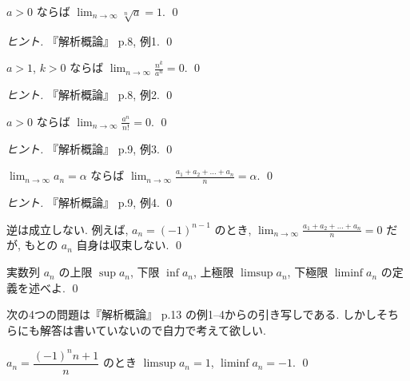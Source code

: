 \documentclass[12pt,twoside]{jarticle}
\begin{document}
\begin{question}
  $a>0$ ならば $\displaystyle\lim_{n\to\infty}\sqrt[n]{a}=1$.
  \qed
\end{question}

\begin{proof}[ヒント]
 『解析概論』\cite{takagi} p.8, 例1. \qed
\end{proof}

\begin{question}
  $a>1$, $k>0$ ならば $\displaystyle\lim_{n\to\infty}\frac{n^k}{a^n}=0$.
  \qed
\end{question}

\begin{proof}[ヒント]
 『解析概論』\cite{takagi} p.8, 例2. \qed
\end{proof}

\begin{question}
  $a>0$ ならば $\displaystyle\lim_{n\to\infty}\frac{a^n}{n!}=0$.
  \qed
\end{question}

\begin{proof}[ヒント]
 『解析概論』\cite{takagi} p.9, 例3. \qed
\end{proof}

\begin{question}\qstar{*}
  $\displaystyle\lim_{n\to\infty}a_n=\alpha$ ならば
  $\displaystyle\lim_{n\to\infty}\frac{a_1+a_2+\dots+a_n}{n}=\alpha$.
  \qed
\end{question}

\begin{proof}[ヒント]
 『解析概論』\cite{takagi} p.9, 例4. \qed
\end{proof}

\begin{rem}
 逆は成立しない. 例えば, $a_n = (-1)^{n-1}$ のとき,
 $\displaystyle\lim_{n\to\infty}\frac{a_1+a_2+\dots+a_n}{n}=0$ だが, 
 もとの $a_n$ 自身は収束しない. 
 \qed
\end{rem}

\begin{question}[簡単]
 実数列 $a_n$ の上限 $\sup a_n$, 下限 $\inf a_n$, 
 上極限 $\limsup a_n$, 下極限 $\liminf a_n$ の定義を述べよ.
 \qed
\end{question}

次の4つの問題は『解析概論』\cite{takagi} p.13 の例1--4からの引き写しである.
しかしそちらにも解答は書いていないので自力で考えて欲しい.

\begin{question}
 $a_n=\dfrac{(-1)^n n+1}{n}$ のとき $\limsup a_n=1$, $\liminf a_n=-1$.
 \qed
\end{question}
\end{document}
